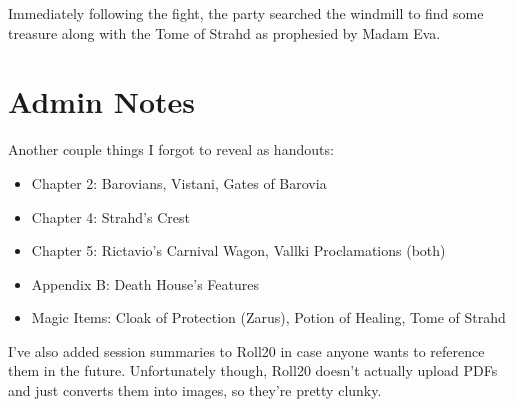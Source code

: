 \documentclass[a4paper,11pt]{article}
\begin{document}
Immediately following the fight, the party searched the windmill to find some treasure along with the Tome of 
Strahd as prophesied by Madam Eva.

\section{Admin Notes}
Another couple things I forgot to reveal as handouts:
\begin{itemize}
  \item Chapter 2: Barovians, Vistani, Gates of Barovia
  \item Chapter 4: Strahd's Crest
  \item Chapter 5: Rictavio's Carnival Wagon, Vallki Proclamations (both)
  \item Appendix B: Death House's Features
  \item Magic Items: Cloak of Protection (Zarus), Potion of Healing, Tome of Strahd
\end{itemize}
I've also added session summaries to Roll20 in case anyone wants to reference them in the future. Unfortunately though, Roll20 doesn't actually upload PDFs and just converts them into images, so they're pretty clunky.
\end{document}
